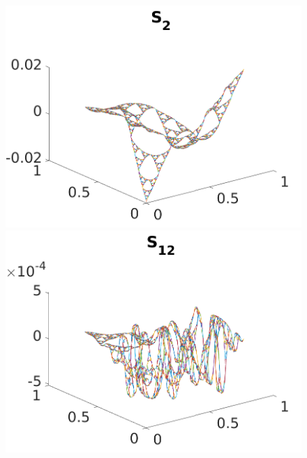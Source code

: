 \documentclass[12pt]{amsart}
\theoremstyle{plain}
\theoremstyle{definition}
\begin{document}
\begin{figure}[H]
\centering
    \begin{minipage}{.3\textwidth}
    \centering
    \includegraphics[width=\textwidth]{images/H1AntisymOPs0_23/SAntiSym2.png}
    \end{minipage}
    \begin{minipage}{.3\textwidth}
    \centering
    \includegraphics[width=\textwidth]{images/H1AntisymOPs0_23/SAntiSym12.png}
    \end{minipage}
    \begin{minipage}{.3\textwidth}
    \centering

\end{minipage}
\end{figure}
\end{document}
